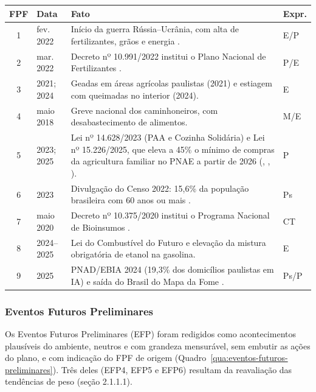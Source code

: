 \documentclass[
	12pt,				%
	openright,			%
	oneside,			%
	a4paper,			%
	chapter=TITLE,		%
	section=TITLE,		%
	english,			%
	french,				%
	spanish,			%
	brazil,				%
 ]{abntex2}
\begin{document}
\begin{quadro}[!htbp]
\centering
\caption{Fatos portadores de futuro}
\label{qua:fatos-portadores-futuro}
\footnotesize
\renewcommand{\arraystretch}{1.05}
\setlength{\tabcolsep}{3pt}
\begin{tabularx}{\textwidth}{|c|p{1.5cm}|>{\raggedright\arraybackslash}X|>{\centering\arraybackslash}p{1.1cm}|}
\hline
\textbf{FPF} & \textbf{Data} & \textbf{Fato} & \textbf{Expr.} \\
\hline
1 & fev. 2022 & Início da guerra Rússia--Ucrânia, com alta de fertilizantes, grãos e energia \cite{fao2022ukraine}. & E/P \\
\hline
2 & mar. 2022 & Decreto nº 10.991/2022 institui o Plano Nacional de Fertilizantes \cite{brasil2022fertilizantes}. & P/E \\
\hline
3 & 2021; 2024 & Geadas em áreas agrícolas paulistas (2021) e estiagem com queimadas no interior (2024). & E \\
\hline
4 & maio 2018 & Greve nacional dos caminhoneiros, com desabastecimento de alimentos. & M/E \\
\hline
5 & 2023; 2025 & Lei nº 14.628/2023 (PAA e Cozinha Solidária) e Lei nº 15.226/2025, que eleva a 45\% o mínimo de compras da agricultura familiar no PNAE a partir de 2026 (\citeauthor{brasil2023paa}, \citeyear{brasil2023paa}, \citeyear{brasil2025pnae}). & P \\
\hline
6 & 2023 & Divulgação do Censo 2022: 15,6\% da população brasileira com 60 anos ou mais \cite{ibge_censo2022}. & Ps \\
\hline
7 & maio 2020 & Decreto nº 10.375/2020 institui o Programa Nacional de Bioinsumos \cite{brasil2020bioinsumos}. & CT \\
\hline
8 & 2024--2025 & Lei do Combustível do Futuro e elevação da mistura obrigatória de etanol na gasolina. & E \\
\hline
9 & 2025 & PNAD/EBIA 2024 (19,3\% dos domicílios paulistas em IA) e saída do Brasil do Mapa da Fome \cite{ibge_pnadc2024a,fao_sofi2025}. & Ps/P \\
\hline
\end{tabularx}
\end{quadro}

\subsubsection{Eventos Futuros Preliminares}
Os Eventos Futuros Preliminares (EFP) foram redigidos como acontecimentos
plausíveis do ambiente, neutros e com grandeza mensurável, sem embutir as
ações do plano, e com indicação do FPF de origem
(Quadro~\ref{qua:eventos-futuros-preliminares}).
Três deles (EFP4, EFP5 e EFP6) resultam da reavaliação das tendências de peso
(seção 2.1.1.1).
\end{document}
